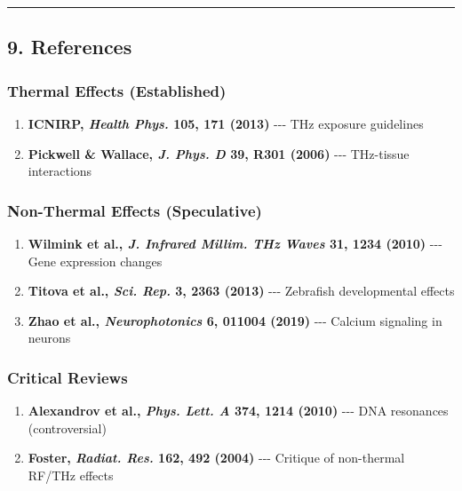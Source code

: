 \begin{center}\rule{0.5\linewidth}{0.5pt}\end{center}

\subsection{9. References}\label{references}

\subsubsection{Thermal Effects
(Established)}\label{thermal-effects-established-1}

\begin{enumerate}
\def\labelenumi{\arabic{enumi}.}
\tightlist
\item
  \textbf{ICNIRP, \emph{Health Phys.} 105, 171 (2013)} -\/-\/- THz
  exposure guidelines
\item
  \textbf{Pickwell \& Wallace, \emph{J. Phys. D} 39, R301 (2006)}
  -\/-\/- THz-tissue interactions
\end{enumerate}

\subsubsection{Non-Thermal Effects
(Speculative)}\label{non-thermal-effects-speculative-1}

\begin{enumerate}
\def\labelenumi{\arabic{enumi}.}
\setcounter{enumi}{2}
\tightlist
\item
  \textbf{Wilmink et al., \emph{J. Infrared Millim. THz Waves} 31, 1234
  (2010)} -\/-\/- Gene expression changes
\item
  \textbf{Titova et al., \emph{Sci. Rep.} 3, 2363 (2013)} -\/-\/-
  Zebrafish developmental effects
\item
  \textbf{Zhao et al., \emph{Neurophotonics} 6, 011004 (2019)} -\/-\/-
  Calcium signaling in neurons
\end{enumerate}

\subsubsection{Critical Reviews}\label{critical-reviews}

\begin{enumerate}
\def\labelenumi{\arabic{enumi}.}
\setcounter{enumi}{5}
\tightlist
\item
  \textbf{Alexandrov et al., \emph{Phys. Lett. A} 374, 1214 (2010)}
  -\/-\/- DNA resonances (controversial)
\item
  \textbf{Foster, \emph{Radiat. Res.} 162, 492 (2004)} -\/-\/- Critique
  of non-thermal RF/THz effects
\end{enumerate}

